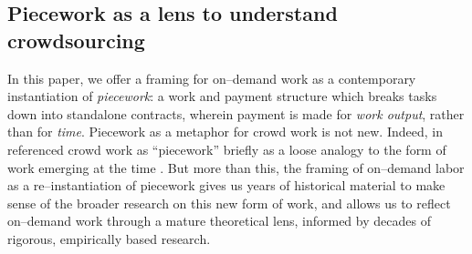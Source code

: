\documentclass[trackingWork]{subfiles}
\begin{document}
\subsection{Piecework as a lens to understand crowdsourcing}
In this paper, we offer a framing for on--demand work as a contemporary instantiation of \textit{piecework}: %
a work and payment structure which breaks tasks down into standalone contracts,
wherein payment is made for \textit{work output}, rather than for \textit{time}.
Piecework as a metaphor for crowd work is not new.
Indeed,
\citeauthor{crowdworkFuture} in \citeyear{crowdworkFuture}
referenced crowd work as ``piecework'' briefly
as a loose analogy to the form of work emerging at the time
\cite{crowdworkFuture}.
But more than this,
the framing of on--demand labor as a re--instantiation of piecework
gives us years of historical material to make sense of the broader research on this new form of work, and allows us to reflect on--demand work through a mature theoretical lens, informed by decades of rigorous, empirically based research.
\end{document}
